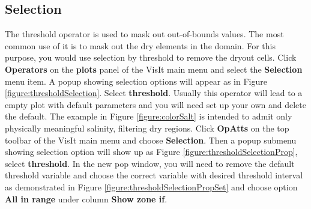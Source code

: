 \documentclass[12pt]{report}
\begin{document}
    \subsection{Selection}\label{sec:thresholdOperator}
    
    The threshold operator is used to mask out out-of-bounds values. 
		The most common use of it is to mask out the dry elements in the domain. 
		For this purpose, you would use selection by threshold to remove the dryout cells. 
		Click {\bf Operators} on the {\bf plots} panel of the VisIt 
		main menu and select the {\bf Selection} menu item. A popup showing
    selection options will appear as in Figure \ref{figure:thresholdSelection}. 
		Select {\bf threshold}. Usually this operator will lead to
    a empty plot with default parameters and you will need set up your own and delete the default. 
		The example in Figure \ref{figure:colorSalt} is intended to admit
		only physically meaningful salinity, filtering 
		dry regions. Click {\bf OpAtts} on the top toolbar of the VisIt main menu 
		and choose {\bf Selection}. Then a popup submenu showing selection option will 
		show up as Figure \ref{figure:thresholdSelectionProp}, select {\bf threshold}. In the new pop window, 
		you will need to remove the default threshold variable and choose 
		the correct variable with desired threshold interval as demonstrated in Figure
    \ref{figure:thresholdSelectionPropSet} and choose option {\bf All in range} under column {\bf Show zone if}.
     
\end{document}

